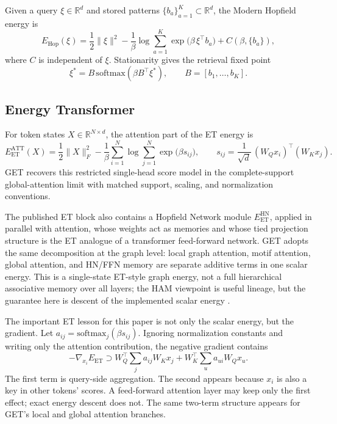 \documentclass[11pt,a4paper]{article}
\begin{document}
Given a query $\xi\in\mathbb{R}^d$ and stored patterns
$\{b_a\}_{a=1}^K\subset\mathbb{R}^d$, the Modern Hopfield energy
\citep{ramsauer2021hopfield} is
\begin{equation}
  E_{\mathrm{Hop}}(\xi)
  = \frac{1}{2}\|\xi\|^2
    - \frac{1}{\beta}\log\sum_{a=1}^K\exp\!\bigl(\beta\,\xi^\top b_a\bigr)
    + C(\beta,\{b_a\}),
  \label{eq:mhn-scalar}
\end{equation}
where $C$ is independent of $\xi$. Stationarity gives the retrieval fixed
point
\begin{equation}
  \xi^* = B\,\mathrm{softmax}(\beta B^\top \xi^*),
  \qquad B=[b_1,\ldots,b_K].
  \label{eq:mhn-fixedpt}
\end{equation}

\subsection{Energy Transformer}

For token states $X\in\mathbb{R}^{N\times d}$, the attention part of the ET
energy \citep{hoover2023energy} is
\begin{equation}
  E_{\mathrm{ET}}^{\mathrm{ATT}}(X)
  = \frac{1}{2}\|X\|_F^2
    - \frac{1}{\beta}\sum_{i=1}^N
      \log\sum_{j=1}^N\exp\!\bigl(\beta s_{ij}\bigr),
  \qquad
  s_{ij} = \frac{1}{\sqrt{d}}\,{(W_Q x_i)}^\top(W_K x_j).
  \label{eq:et}
\end{equation}
GET recovers this restricted single-head score model in the complete-support
global-attention limit with matched support, scaling, and normalization
conventions.

The published ET block also contains a Hopfield Network module
$E_{\mathrm{ET}}^{\mathrm{HN}}$, applied in parallel with attention, whose
weights act as memories and whose tied projection structure is the ET analogue
of a transformer feed-forward network. GET adopts the same decomposition at
the graph level: local graph attention, motif attention, global attention, and
HN/FFN memory are separate additive terms in one scalar energy. This is a
single-state ET-style graph energy, not a full hierarchical associative memory
over all layers; the HAM viewpoint is useful lineage, but the guarantee here is
descent of the implemented scalar energy \citep{hoover2022universal}.

The important ET lesson for this paper is not only the scalar energy, but the
gradient. Let
$a_{ij}=\mathrm{softmax}_{j}(\beta s_{ij})$. Ignoring normalization constants
and writing only the attention contribution, the negative gradient contains
\begin{equation}
  -\nabla_{x_i}E_{\mathrm{ET}}
  \supset
  W_Q^\top\sum_j a_{ij}W_Kx_j
  +
  W_K^\top\sum_u a_{ui}W_Qx_u .
  \label{eq:et-two-term}
\end{equation}
The first term is query-side aggregation. The second appears because $x_i$ is
also a key in other tokens' scores. A feed-forward attention layer may keep only
the first effect; exact energy descent does not. The same two-term structure
appears for GET's local and global attention branches.
\end{document}
